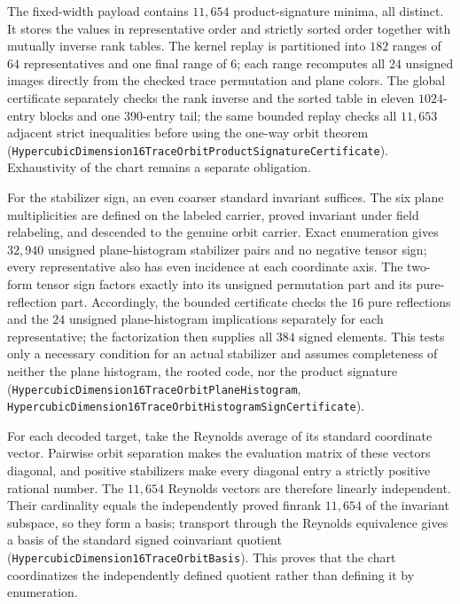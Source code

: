 \documentclass[11pt]{article}
\theoremstyle{definition}
\begin{document}
The fixed-width payload contains $11{,}654$ product-signature minima, all
distinct.  It stores the values in representative order and strictly sorted
order together with mutually inverse rank tables.  The kernel replay is
partitioned into $182$ ranges of $64$ representatives and one final range of
$6$; each range recomputes all $24$ unsigned images directly from the checked
trace permutation and plane colors.  The global certificate separately checks
the rank inverse and the sorted table in eleven $1024$-entry blocks and one
$390$-entry tail; the same bounded replay checks all $11{,}653$ adjacent
strict inequalities before using the one-way orbit theorem
(\texttt{HypercubicDimension16TraceOrbitProductSignatureCertificate}).
Exhaustivity of the chart remains a separate obligation.

For the stabilizer sign, an even coarser standard invariant suffices.  The six
plane multiplicities are defined on the labeled carrier, proved invariant
under field relabeling, and descended to the genuine orbit carrier.  Exact
enumeration gives $32{,}940$ unsigned plane-histogram stabilizer pairs and no
negative tensor sign; every representative also has even incidence at each
coordinate axis.  The two-form tensor sign factors exactly into its unsigned
permutation part and its pure-reflection part.  Accordingly, the bounded
certificate checks the $16$ pure reflections and the $24$ unsigned
plane-histogram implications separately for each representative; the
factorization then supplies all $384$ signed elements.  This tests only a
necessary condition for an actual stabilizer and assumes completeness of
neither the plane histogram, the rooted code, nor the product signature
(\texttt{HypercubicDimension16TraceOrbitPlaneHistogram},
\texttt{HypercubicDimension16TraceOrbitHistogramSignCertificate}).

For each decoded target, take the Reynolds average of its standard coordinate
vector.  Pairwise orbit separation makes the evaluation matrix of these
vectors diagonal, and positive stabilizers make every diagonal entry a
strictly positive rational number.  The $11{,}654$ Reynolds vectors are
therefore linearly independent.  Their cardinality equals the independently
proved finrank $11{,}654$ of the invariant subspace, so they form a basis;
transport through the Reynolds equivalence gives a basis of the standard
signed coinvariant quotient
(\texttt{HypercubicDimension16TraceOrbitBasis}).  This proves that the chart
coordinatizes the independently defined quotient rather than defining it by
enumeration.
\end{document}
